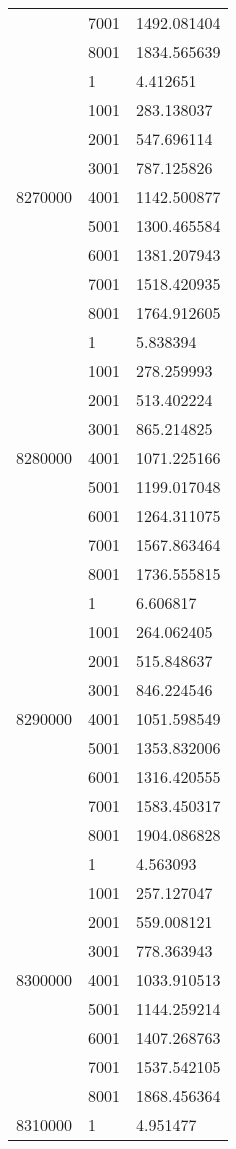 \begin{table}[htb!]
\begin{tabular}{lll}
 & 7001 & 1492.081404 \\
 & 8001 & 1834.565639 \\
\multirow[c]{9}{*}{8270000} & 1 & 4.412651 \\
 & 1001 & 283.138037 \\
 & 2001 & 547.696114 \\
 & 3001 & 787.125826 \\
 & 4001 & 1142.500877 \\
 & 5001 & 1300.465584 \\
 & 6001 & 1381.207943 \\
 & 7001 & 1518.420935 \\
 & 8001 & 1764.912605 \\
\multirow[c]{9}{*}{8280000} & 1 & 5.838394 \\
 & 1001 & 278.259993 \\
 & 2001 & 513.402224 \\
 & 3001 & 865.214825 \\
 & 4001 & 1071.225166 \\
 & 5001 & 1199.017048 \\
 & 6001 & 1264.311075 \\
 & 7001 & 1567.863464 \\
 & 8001 & 1736.555815 \\
\multirow[c]{9}{*}{8290000} & 1 & 6.606817 \\
 & 1001 & 264.062405 \\
 & 2001 & 515.848637 \\
 & 3001 & 846.224546 \\
 & 4001 & 1051.598549 \\
 & 5001 & 1353.832006 \\
 & 6001 & 1316.420555 \\
 & 7001 & 1583.450317 \\
 & 8001 & 1904.086828 \\
\multirow[c]{9}{*}{8300000} & 1 & 4.563093 \\
 & 1001 & 257.127047 \\
 & 2001 & 559.008121 \\
 & 3001 & 778.363943 \\
 & 4001 & 1033.910513 \\
 & 5001 & 1144.259214 \\
 & 6001 & 1407.268763 \\
 & 7001 & 1537.542105 \\
 & 8001 & 1868.456364 \\
\multirow[c]{9}{*}{8310000} & 1 & 4.951477 \\

\end{tabular}
\end{table}
